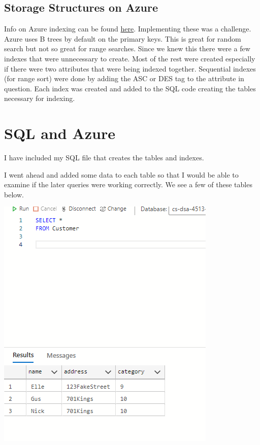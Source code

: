 \documentclass[11pt]{article}
\begin{document}
\subsection{Storage Structures on Azure}
Info on Azure indexing can be found \href{https://learn.microsoft.com/en-us/sql/relational-databases/indexes/indexes?view=sql-server-ver16}{here}.  Implementing these was a challenge.  Azure uses B trees by default on the primary keys.  This is great for random search but not so great for range searches.  Since we knew this there were a few indexes that were unnecessary to create.  Most of the rest were created especially if there were two attributes that were being indexed together.  Sequential indexes (for range sort) were done by adding the ASC or DES tag to the attribute in question.  Each index was created and added to the SQL code creating the tables necessary for indexing.

\section{SQL and Azure}

I have included my SQL file that creates the tables and indexes.


I went ahead and added some data to each table so that I would be able to examine if the later queries were working correctly.  We see a few of these tables below.

\includegraphics[width = \textwidth]{custTable.png}
\end{document}
